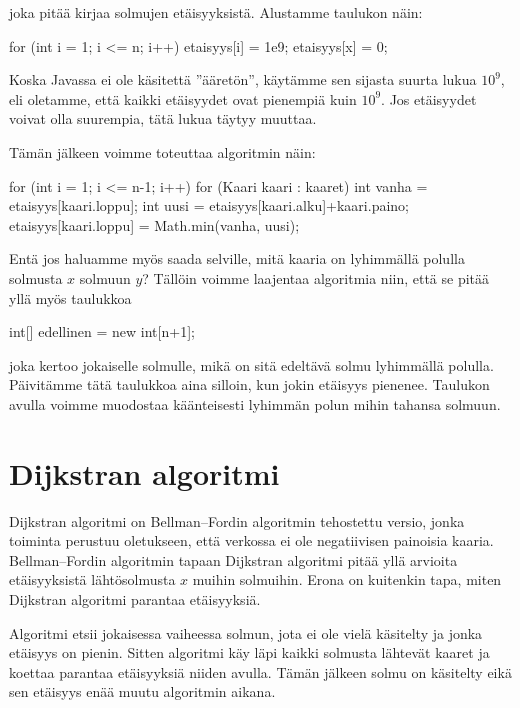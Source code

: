 joka pitää kirjaa solmujen etäisyyksistä.
Alustamme taulukon näin:

\begin{code}
for (int i = 1; i <= n; i++) {
    etaisyys[i] = 1e9;
}
etaisyys[x] = 0;
\end{code}

Koska Javassa ei ole käsitettä ''ääretön'', käytämme sen sijasta
suurta lukua $10^9$, eli oletamme, että kaikki etäisyydet
ovat pienempiä kuin $10^9$.
Jos etäisyydet voivat olla suurempia, tätä lukua täytyy muuttaa.

Tämän jälkeen voimme toteuttaa algoritmin näin:

\begin{code}
for (int i = 1; i <= n-1; i++) {
    for (Kaari kaari : kaaret) {
        int vanha = etaisyys[kaari.loppu];
        int uusi = etaisyys[kaari.alku]+kaari.paino;
        etaisyys[kaari.loppu] = Math.min(vanha, uusi);
    }
}
\end{code}

Entä jos haluamme myös saada selville,
mitä kaaria on lyhimmällä polulla solmusta $x$ solmuun $y$?
Tällöin voimme laajentaa algoritmia niin,
että se pitää yllä myös taulukkoa

\begin{code}
int[] edellinen = new int[n+1];
\end{code}

joka kertoo jokaiselle solmulle, mikä on sitä edeltävä
solmu lyhimmällä polulla.
Päivitämme tätä taulukkoa aina silloin,
kun jokin etäisyys pienenee.
Taulukon avulla voimme muodostaa käänteisesti
lyhimmän polun mihin tahansa solmuun.

\section{Dijkstran algoritmi}

Dijkstran algoritmi on Bellman–Fordin algoritmin tehostettu versio,
jonka toiminta perustuu oletukseen, että verkossa ei ole
negatiivisen painoisia kaaria.
Bellman–Fordin algoritmin tapaan Dijkstran algoritmi pitää
yllä arvioita etäisyyksistä lähtösolmusta $x$ muihin solmuihin.
Erona on kuitenkin tapa, miten Dijkstran algoritmi parantaa etäisyyksiä.

Algoritmi etsii jokaisessa vaiheessa solmun, jota ei ole vielä
käsitelty ja jonka etäisyys on pienin.
Sitten algoritmi käy läpi kaikki solmusta lähtevät kaaret ja
koettaa parantaa etäisyyksiä niiden avulla.
Tämän jälkeen solmu on käsitelty eikä sen etäisyys enää
muutu algoritmin aikana.

